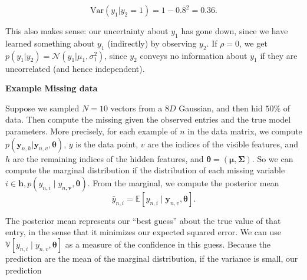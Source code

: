 \documentclass[10pt,landscape]{article}
\newcommand{\var}{\mathbb{V}}
\newcommand{\out}{\textbf{y}}
\newcommand{\parameter}{\boldsymbol{\theta}}
\newcommand{\Cov}{\mathbf{\Sigma}}
\newcommand{\Mean}{\boldsymbol{\mu}}
\begin{document}
\begin{multicols*}{3}
\[
\text{Var}(y_1 | y_2 = 1) = 1 - 0.8^2 = 0.36.
\]

This also makes sense: our uncertainty about \( y_1 \) has gone down, since we have learned something about \( y_1 \) (indirectly) by observing \( y_2 \). If \( \rho = 0 \), we get \( p(y_1 | y_2) = \mathcal{N}(y_1 | \mu_1, \sigma_1^2) \), since \( y_2 \) conveys no information about \( y_1 \) if they are uncorrelated (and hence independent).

\textbf{Example Missing data}

Suppose we sampled $N=10$ vectors from a $8D$ Gaussian, and then hid $50 \%$ of data. Then compute the missing given the observed entries and the true model parameters. More precisely, for each example of $n$ in the data matrix, we compute $p(\out_{n,h}|\out_{n,v},\parameter)$, $y$ is the data point, $v$ are the indices of the visible features, and $h$ are the remaining indices of the hidden features, and $\parameter=(\Mean,\Cov)$. So we can compute the marginal distribution if the distribution of each missing variable $i\in\mathbf{h},p(y_{n,i}\mid y_{n,\mathbf{v}},\parameter)$. From the marginal, we compute the  posterior mean
\[
    \bar{y}_{n,i} = \mathbb{E} \left[ y_{n,i} \mid \mathbf{y}_{n,v}, \boldsymbol{\theta} \right].
\]

The posterior mean represents our “best guess” about the true value of that entry, in the sense that it minimizes our expected squared error. We can use $\var[y_{n,i}\mid y_{n,v},\parameter]$ as a measure of the confidence in this guess. Because the prediction are the mean of the marginal distribution, if the variance is small, our prediction

\end{multicols*}
\end{document}
